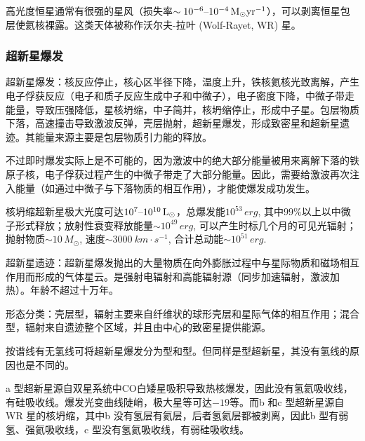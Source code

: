 \documentclass[../天体物理基础.tex]{subfiles}
\begin{document}
高光度恒星通常有很强的星风（损失率$\sim10^{-6}\text{\textendash}10^{-4}\,\unit{M_{\odot}yr^{-1}}$），可以剥离恒星包层使氦核裸露。这类天体被称作沃尔夫{}-{}拉叶 (Wolf-Rayet, WR) 星。

\subsubsection{超新星爆发}

超新星爆发：核反应停止，核心区半径下降，温度上升，铁核氦核光致离解，产生电子俘获反应（电子和质子反应生成中子和中微子），电子密度下降，中微子带走能量，导致压强降低，星核坍缩，中子简并，核坍缩停止，形成中子星。包层物质下落，高速撞击导致激波反弹，壳层抛射，超新星爆发，形成致密星和超新星遗迹。其能量来源主要是包层物质引力能的释放。

不过即时爆发实际上是不可能的，因为激波中的绝大部分能量被用来离解下落的铁原子核，电子俘获过程产生的中微子带走了大部分能量。因此，需要给激波再次注入能量（如通过中微子与下落物质的相互作用），才能使爆发成功发生。

核坍缩超新星极大光度可达$10^{7}\text{\textendash}10^{10}\,\unit{L_{\odot}}$，总爆发能$10^{53}\,\unit{erg}$, 其中$99\%$以上以中微子形式释放；放射性衰变释放能量$\sim10^{49}\,\unit{erg}$, 可以产生时标几个月的可见光辐射；抛射物质$\sim10\,\unit{M_{\odot}}$, 速度$\sim\qty{3000}{km\cdot{}s^{-1}}$, 合计总动能$\sim10^{51}\,\unit{erg}$.

超新星遗迹：超新星爆发抛出的大量物质在向外膨胀过程中与星际物质和磁场相互作用而形成的气体星云。是强射电辐射和高能辐射源（同步加速辐射，激波加热）。年龄不超过十万年。

形态分类：壳层型，辐射主要来自纤维状的球形壳层和星际气体的相互作用；混合型，辐射来自遗迹整个区域，并且由中心的致密星提供能源。

按谱线有无氢线可将超新星爆发分为\uppercase\expandafter{}型和\uppercase\expandafter{}型。但同样是\uppercase\expandafter{}型超新星，其没有氢线的原因也是不同的。

\uppercase\expandafter{}a 型超新星源自双星系统中$\mathrm{CO}$白矮星吸积导致热核爆发，因此没有氢氦吸收线，有硅吸收线。爆发光变曲线陡峭，极大星等可达$-19$等。而\uppercase\expandafter{}b 和\uppercase\expandafter{}c 型超新星源自 WR 星的核坍缩，其中\uppercase\expandafter{}b 没有氢层有氦层，后者氢氦层都被剥离，因此\uppercase\expandafter{}b 型有弱氢、强氦吸收线，\uppercase\expandafter{}c 型没有氢氦吸收线，有弱硅吸收线。
\end{document}
